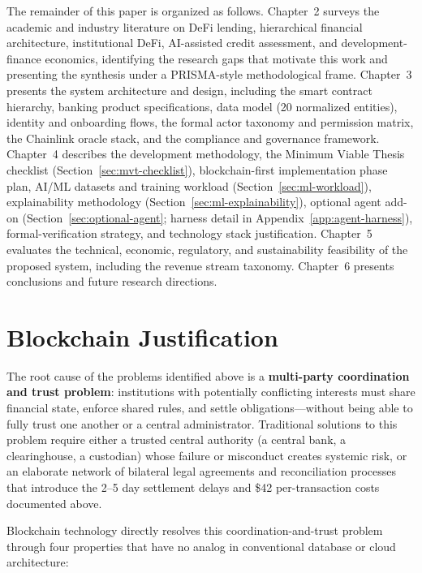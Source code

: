 \documentclass[12pt,a4paper]{report}
\begin{document}
The remainder of this paper is organized as follows. Chapter~2 surveys the academic and industry literature on DeFi lending, hierarchical financial architecture, institutional DeFi, AI-assisted credit assessment, and development-finance economics, identifying the research gaps that motivate this work and presenting the synthesis under a PRISMA-style methodological frame. Chapter~3 presents the system architecture and design, including the smart contract hierarchy, banking product specifications, data model (20 normalized entities), identity and onboarding flows, the formal actor taxonomy and permission matrix, the Chainlink oracle stack, and the compliance and governance framework. Chapter~4 describes the development methodology, the Minimum Viable Thesis checklist (Section~\ref{sec:mvt-checklist}), blockchain-first implementation phase plan, AI/ML datasets and training workload (Section~\ref{sec:ml-workload}), explainability methodology (Section~\ref{sec:ml-explainability}), optional agent add-on (Section~\ref{sec:optional-agent}; harness detail in Appendix~\ref{app:agent-harness}), formal-verification strategy, and technology stack justification. Chapter~5 evaluates the technical, economic, regulatory, and sustainability feasibility of the proposed system, including the revenue stream taxonomy. Chapter~6 presents conclusions and future research directions.

\section{Blockchain Justification}

The root cause of the problems identified above is a \textbf{multi-party coordination and trust problem}: institutions with potentially conflicting interests must share financial state, enforce shared rules, and settle obligations---without being able to fully trust one another or a central administrator. Traditional solutions to this problem require either a trusted central authority (a central bank, a clearinghouse, a custodian) whose failure or misconduct creates systemic risk, or an elaborate network of bilateral legal agreements and reconciliation processes that introduce the 2--5 day settlement delays and \$42 per-transaction costs documented above.

Blockchain technology directly resolves this coordination-and-trust problem through four properties that have no analog in conventional database or cloud architecture:
\end{document}
